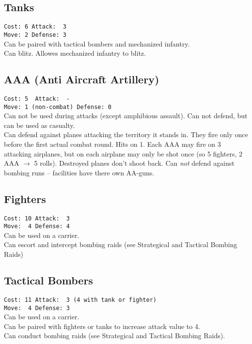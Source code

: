 \documentclass[10pt,twoside]{article}
\begin{document}
\begin{multicols*}{3}
\subsection*{Tanks}
\texttt{Cost: 6 \quad\quad\quad Attack: ~3 \\ Move: 2 \quad\quad\quad Defense: 3 \\ }
Can be paired with tactical bombers and mechanized infantry.\\
Can blitz. Allowes mechanized infantry to blitz.

\subsection*{AAA (Anti Aircraft Artillery)}
\texttt{Cost: 5 \quad\quad\quad\quad\quad\quad\quad ~Attack: ~- \\ Move: 1 (non-combat) \quad Defense: 0 \\}
Can not be used during attacks (except amphibious assault). Can not defend, but can be used as casualty.\\
Can defend against planes attacking the territory it stands in. They fire only once before the first actual combat round. Hits on 1. Each AAA may fire on 3 attacking airplanes, but on each airplane may only be shot once (so 5 fighters, 2 AAA $\rightarrow$ 5 rolls). Destroyed planes don't shoot back. Can \emph{not} defend against bombing runs -- facilities have there own AA-guns.

\subsection*{Fighters}
\texttt{Cost: 10 \quad\quad\quad Attack: ~3 \\ Move: ~4 \quad\quad\quad Defense: 4 \\ }
Can be used on a carrier.\\
Can escort and intercept bombing raids (see \glqq Strategical and Tactical Bombing Raids\grqq)

\subsection*{Tactical Bombers}
\texttt{Cost: 11 \quad Attack: ~3 {\scriptsize(4 with tank or fighter)} \\ Move: ~4 \quad Defense: 3 \\ }
Can be used on a carrier.\\
Can be paired with fighters or tanks to increase attack value to 4.\\
Can conduct bombing raids (see \glqq Strategical and Tactical Bombing Raids\grqq).


\end{multicols*}
\end{document}
